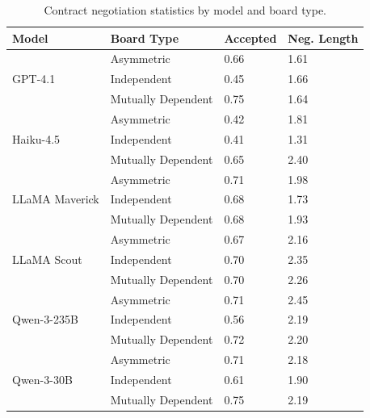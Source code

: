 \begin{table}[htbp]
\centering
\small
\begin{tabular}{llll}
\toprule
Model & Board Type & Accepted & Neg. Length \\
\midrule
\multirow{3}{*}{GPT-4.1} & Asymmetric & 0.66 & 1.61 \\
 & Independent & 0.45 & 1.66 \\
 & Mutually Dependent & 0.75 & 1.64 \\
\cmidrule(lr){1-4}
\multirow{3}{*}{Haiku-4.5} & Asymmetric & 0.42 & 1.81 \\
 & Independent & 0.41 & 1.31 \\
 & Mutually Dependent & 0.65 & 2.40 \\
\cmidrule(lr){1-4}
\multirow{3}{*}{LLaMA Maverick} & Asymmetric & 0.71 & 1.98 \\
 & Independent & 0.68 & 1.73 \\
 & Mutually Dependent & 0.68 & 1.93 \\
\cmidrule(lr){1-4}
\multirow{3}{*}{LLaMA Scout} & Asymmetric & 0.67 & 2.16 \\
 & Independent & 0.70 & 2.35 \\
 & Mutually Dependent & 0.70 & 2.26 \\
\cmidrule(lr){1-4}
\multirow{3}{*}{Qwen-3-235B} & Asymmetric & 0.71 & 2.45 \\
 & Independent & 0.56 & 2.19 \\
 & Mutually Dependent & 0.72 & 2.20 \\
\cmidrule(lr){1-4}
\multirow{3}{*}{Qwen-3-30B} & Asymmetric & 0.71 & 2.18 \\
 & Independent & 0.61 & 1.90 \\
 & Mutually Dependent & 0.75 & 2.19 \\
\bottomrule
\end{tabular}
\caption{Contract negotiation statistics by model and board type.}
\label{tab:contract_stats}
\end{table}